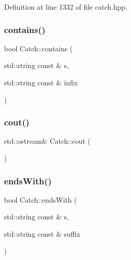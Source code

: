 Definition at line 1332 of file catch.\+hpp.

\mbox{\label{namespace_catch_aa52974b0e426e7e2fbd725a900e9c36e}} 
\subsubsection{\texorpdfstring{contains()}{contains()}}
{\footnotesize\ttfamily bool Catch\+::contains (\begin{DoxyParamCaption}\item[{std\+::string const \&}]{s,  }\item[{std\+::string const \&}]{infix }\end{DoxyParamCaption})}

\mbox{\label{namespace_catch_a50af73c5a37ad5c6558df4ce4a275e83}} 
\subsubsection{\texorpdfstring{cout()}{cout()}}
{\footnotesize\ttfamily std\+::ostream\& Catch\+::cout (\begin{DoxyParamCaption}{ }\end{DoxyParamCaption})}

\mbox{\label{namespace_catch_ada025504f627feaf9ac68ca391515dff}} 
\subsubsection{\texorpdfstring{ends\+With()}{endsWith()}\hspace{0.1cm}{\footnotesize\ttfamily [1/2]}}
{\footnotesize\ttfamily bool Catch\+::ends\+With (\begin{DoxyParamCaption}\item[{std\+::string const \&}]{s,  }\item[{std\+::string const \&}]{suffix }\end{DoxyParamCaption})}

\mbox{\label{namespace_catch_afd801a3e33fd7a8b91ded0d02747a93f}} 
